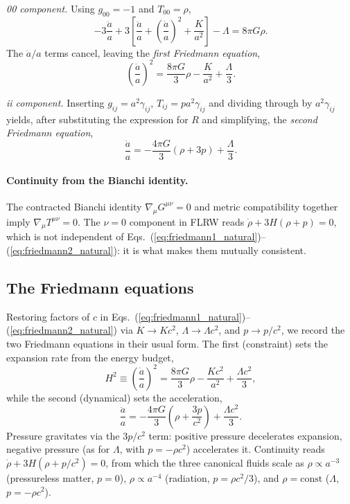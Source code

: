 \documentclass[12pt]{article}
\begin{document}
\emph{00 component.}  Using $g_{00}=-1$ and $T_{00}=\rho$,
%
\begin{equation}
  -3\frac{\ddot a}{a}
  + 3\!\left[\frac{\ddot a}{a}
            + \left(\frac{\dot a}{a}\right)^{\!2}
            + \frac{K}{a^2}\right]
  - \Lambda
  = 8\pi G\rho.
\end{equation}
%
The $\ddot a/a$ terms cancel, leaving the \emph{first Friedmann
equation},
%
\begin{equation}
  \left(\frac{\dot a}{a}\right)^{\!2}
  = \frac{8\pi G}{3}\rho - \frac{K}{a^2} + \frac{\Lambda}{3}.
  \label{eq:friedmann1_natural}
\end{equation}

\emph{ii component.}  Inserting $g_{ij}=a^2\gamma_{ij}$,
$T_{ij}=pa^2\gamma_{ij}$ and dividing through by $a^2\gamma_{ij}$
yields, after substituting the expression for $R$ and simplifying,
the \emph{second Friedmann equation},
%
\begin{equation}
  \frac{\ddot a}{a}
  = -\frac{4\pi G}{3}(\rho + 3p) + \frac{\Lambda}{3}.
  \label{eq:friedmann2_natural}
\end{equation}

\paragraph{Continuity from the Bianchi identity.}
The contracted Bianchi identity $\nabla_\mu G^{\mu\nu}=0$ and
metric compatibility together imply $\nabla_\mu T^{\mu\nu}=0$.  The
$\nu=0$ component in FLRW reads $\dot\rho + 3H(\rho + p) = 0$,
which is not independent of
Eqs.~(\ref{eq:friedmann1_natural})--(\ref{eq:friedmann2_natural}):
it is what makes them mutually consistent.

\subsection{The Friedmann equations}
\label{sec:friedmann}

Restoring factors of $c$ in
Eqs.~(\ref{eq:friedmann1_natural})--(\ref{eq:friedmann2_natural})
via $K\to Kc^2$, $\Lambda\to\Lambda c^2$, and $p\to p/c^2$, we
record the two Friedmann equations in their usual form.  The first
(constraint) sets the expansion rate from the energy budget,
%
\begin{equation}
  H^2 \equiv \left(\frac{\dot a}{a}\right)^{\!2}
  = \frac{8\pi G}{3}\rho - \frac{Kc^2}{a^2} + \frac{\Lambda c^2}{3},
  \label{eq:friedmann1}
\end{equation}
%
while the second (dynamical) sets the acceleration,
%
\begin{equation}
  \frac{\ddot a}{a}
  = -\frac{4\pi G}{3}\!\left(\rho + \frac{3p}{c^2}\right)
    + \frac{\Lambda c^2}{3}.
  \label{eq:friedmann2}
\end{equation}
%
Pressure gravitates via the $3p/c^2$ term: positive pressure
decelerates expansion, negative pressure (as for $\Lambda$, with
$p=-\rho c^2$) accelerates it.  Continuity reads
$\dot\rho + 3H(\rho + p/c^2) = 0$, from which the three canonical
fluids scale as $\rho\propto a^{-3}$ (pressureless matter, $p=0$),
$\rho\propto a^{-4}$ (radiation, $p=\rho c^2/3$), and
$\rho=\text{const}$ ($\Lambda$, $p=-\rho c^2$).
\end{document}
